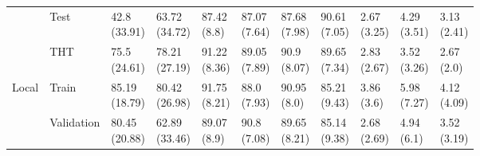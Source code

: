 \begin{table}
\begin{tabular}{lllllllllll}
       & Test &   \makecell{42.8\\(33.91)} &  \makecell{63.72\\(34.72)} &    \makecell{87.42\\(8.8)} &  \makecell{87.07\\(7.64)} &  \makecell{87.68\\(7.98)} &  \makecell{90.61\\(7.05)} &      \makecell{2.67\\(3.25)} &  \makecell{4.29\\(3.51)} &  \makecell{3.13\\(2.41)} \\
       & THT &   \makecell{75.5\\(24.61)} &  \makecell{78.21\\(27.19)} &   \makecell{91.22\\(8.36)} &  \makecell{89.05\\(7.89)} &   \makecell{90.9\\(8.07)} &  \makecell{89.65\\(7.34)} &      \makecell{2.83\\(2.67)} &  \makecell{3.52\\(3.26)} &   \makecell{2.67\\(2.0)} \\
Local & Train &  \makecell{85.19\\(18.79)} &  \makecell{80.42\\(26.98)} &   \makecell{91.75\\(8.21)} &   \makecell{88.0\\(7.93)} &   \makecell{90.95\\(8.0)} &  \makecell{85.21\\(9.43)} &       \makecell{3.86\\(3.6)} &  \makecell{5.98\\(7.27)} &  \makecell{4.12\\(4.09)} \\
       & Validation &  \makecell{80.45\\(20.88)} &  \makecell{62.89\\(33.46)} &    \makecell{89.07\\(8.9)} &   \makecell{90.8\\(7.08)} &  \makecell{89.65\\(8.21)} &  \makecell{85.14\\(9.38)} &      \makecell{2.68\\(2.69)} &   \makecell{4.94\\(6.1)} &  \makecell{3.52\\(3.19)} \\

\end{tabular}
\end{table}
